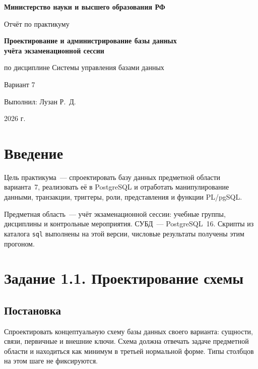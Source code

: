 \documentclass[12pt,a4paper]{article}
\begin{document}
\begin{titlepage}
  \centering
  \vspace*{1cm}
  {\LARGE \textbf{Министерство науки и высшего образования РФ}\par}
  \vspace{0.5cm}
  {\large Отчёт по практикуму\par}
  \vspace{0.3cm}
  {\Large \textbf{Проектирование и администрирование базы данных\\учёта экзаменационной сессии}\par}
  \vspace{0.3cm}
  {\large по дисциплине \guillemotleft Системы управления базами данных\guillemotright\par}
  \vspace{0.4cm}
  {\large Вариант 7\par}
  \vfill
  \begin{flushright}
    Выполнил: Лузан Р.~Д.\par
  \end{flushright}
  \vfill
  {\large 2026 г.\par}
\end{titlepage}

\tableofcontents
\newpage

\section*{Введение}
Цель практикума~--- спроектировать базу данных предметной области варианта~7, реализовать её в PostgreSQL и отработать манипулирование данными, транзакции, триггеры, роли, представления и функции PL/pgSQL.

Предметная область~--- учёт экзаменационной сессии: учебные группы, дисциплины и контрольные мероприятия. СУБД~--- PostgreSQL~16. Скрипты из каталога \texttt{sql} выполнены на этой версии, числовые результаты получены этим прогоном.

\section*{Задание 1.1. Проектирование схемы}
\subsection*{Постановка}
Спроектировать концептуальную схему базы данных своего варианта: сущности, связи, первичные и внешние ключи. Схема должна отвечать задаче предметной области и находиться как минимум в третьей нормальной форме. Типы столбцов на этом шаге не фиксируются.
\end{document}
